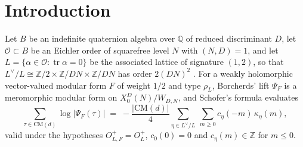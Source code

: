 \documentclass[11pt,reqno]{amsart}
\theoremstyle{plain}
\theoremstyle{definition}
\DeclareMathOperator{\tr}{tr}
\newcommand{\Q}{\mathbb{Q}}
\newcommand{\Z}{\mathbb{Z}}
\newcommand{\Ldual}{L^{\vee}}
\begin{document}
\begin{abstract}
Finally we locate where the transmitted recipe loses the term. The space of weight-$1/2$ forms for
the Weil representation vanishes, so the input form is determined by its principal part and its
constant term at the zero coset is genuinely zero; and no per-form normalisation can produce the
observed failure, since the uncorrected values are mutually inconsistent on a base where a uniform
rescaling could not make them so. What remains is that the $m=0$ term collapses a sum over
isotropic cosets to the zero coset by a condition constraining only the negative-definite part of
the coset: the surviving nonzero cosets carry the whole correction. We then evaluate the
coefficient they carry, obtaining $\kappa_\eta(0)=-\log N/(N-1)$ at each of the $2N-2$ of them, and
summing recovers the measured correction exactly, the factor $\tfrac12$ appearing as
$\tfrac14\cdot\tfrac{2N-2}{N-1}$ and hence independently of $N$. The $\log N$ arises at the level
prime, not at a place of $\mathrm{Diff}$ --- not because the local factor there vanishes, but
because at the zero coset it has a pole, which the passage to a nonzero coset converts into the
zero whose derivative is taken. That mechanism is invisible to a case analysis tracking orders of
vanishing, which is why the term was lost.
\end{abstract}

\maketitle

\section{Introduction}

Let $B$ be an indefinite quaternion algebra over $\Q$ of reduced discriminant $D$, let
$\mathcal{O}\subset B$ be an Eichler order of squarefree level $N$ with $(N,D)=1$, and let
$L=\{\alpha\in\mathcal{O}:\tr\alpha=0\}$ be the associated lattice of signature $(1,2)$, so that
$\Ldual/L\cong \Z/2\times\Z/DN\times\Z/DN$ has order $2(DN)^2$ \cite[Lemma 8]{GY}. For a weakly
holomorphic vector-valued modular form $F$ of weight $1/2$ and type $\rho_L$, Borcherds' lift \cite{Borcherds}
$\Psi_F$ is a meromorphic modular form on $X_0^D(N)/W_{D,N}$, and Schofer's formula
\cite{Schofer,GY} evaluates
\[
  \sum_{\tau\in \mathrm{CM}(d)}\log\lvert\Psi_F(\tau)\rvert
  \;=\;-\frac{\lvert \mathrm{CM}(d)\rvert}{4}\sum_{\eta\in\Ldual/L}\ \sum_{m\ge 0}
     c_\eta(-m)\,\kappa_\eta(m),
\]
valid under the hypotheses $O^+_{L,F}=O^+_L$, $c_0(0)=0$ and $c_\eta(m)\in\Z$ for $m\le 0$.
\end{document}
